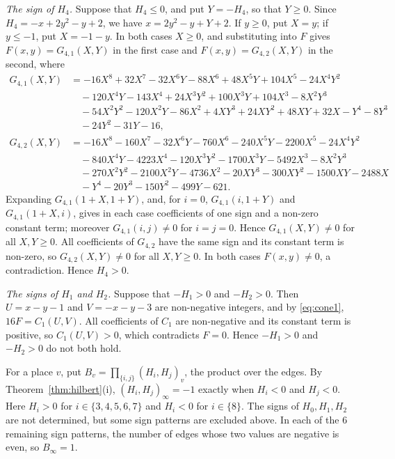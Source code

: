 \documentclass[11pt]{article}
\begin{document}
\emph{The sign of $H_{4}$.} Suppose that $H_{4}\leq0$, and put $Y=-H_{4}$, so that $Y\geq0$. Since $H_{4}=-x+2y^{2}-y+2$, we have $x=2y^{2}-y+Y+2$. If $y\geq0$, put $X=y$; if $y\leq-1$, put $X=-1-y$. In both cases $X\geq0$, and substituting into $F$ gives $F(x,y)=G_{4,1}(X,Y)$ in the first case and $F(x,y)=G_{4,2}(X,Y)$ in the second, where
\begin{align*}
G_{4,1}(X,Y)&=-16X^{8}+32X^{7}-32X^{6}Y-88X^{6}+48X^{5}Y+104X^{5}-24X^{4}Y^{2}\\
&\quad-120X^{4}Y-143X^{4}+24X^{3}Y^{2}+100X^{3}Y+104X^{3}-8X^{2}Y^{3}\\
&\quad-54X^{2}Y^{2}-120X^{2}Y-86X^{2}+4XY^{3}+24XY^{2}+48XY+32X-Y^{4}-8Y^{3}\\
&\quad-24Y^{2}-31Y-16,\\
G_{4,2}(X,Y)&=-16X^{8}-160X^{7}-32X^{6}Y-760X^{6}-240X^{5}Y-2200X^{5}-24X^{4}Y^{2}\\
&\quad-840X^{4}Y-4223X^{4}-120X^{3}Y^{2}-1700X^{3}Y-5492X^{3}-8X^{2}Y^{3}\\
&\quad-270X^{2}Y^{2}-2100X^{2}Y-4736X^{2}-20XY^{3}-300XY^{2}-1500XY-2488X\\
&\quad-Y^{4}-20Y^{3}-150Y^{2}-499Y-621.
\end{align*}
Expanding $G_{4,1}(1+X,1+Y)$, and, for $i=0$, $G_{4,1}(i,1+Y)$ and $G_{4,1}(1+X,i)$, gives in each case coefficients of one sign and a non-zero constant term; moreover $G_{4,1}(i,j)\neq0$ for $i=j=0$. Hence $G_{4,1}(X,Y)\neq0$ for all $X,Y\geq0$. All coefficients of $G_{4,2}$ have the same sign and its constant term is non-zero, so $G_{4,2}(X,Y)\neq0$ for all $X,Y\geq0$. In both cases $F(x,y)\neq0$, a contradiction. Hence $H_{4}>0$.

\emph{The signs of $H_{1}$ and $H_{2}$.} Suppose that $-H_{1}>0$ and $-H_{2}>0$. Then $U=x-y-1$ and $V=-x-y-3$ are non-negative integers, and by \eqref{eq:cone1}, $16F=C_{1}(U,V)$. All coefficients of $C_{1}$ are non-negative and its constant term is positive, so $C_{1}(U,V)>0$, which contradicts $F=0$. Hence $-H_{1}>0$ and $-H_{2}>0$ do not both hold.

For a place $v$, put $B_v=\prod_{\{i,j\}}(H_i,H_j)_v$, the product over the edges. By Theorem~\ref{thm:hilbert}(i), $(H_i,H_j)_\infty=-1$ exactly when $H_i<0$ and $H_j<0$. Here $H_i>0$ for $i\in\{3,\allowbreak 4,\allowbreak 5,\allowbreak 6,\allowbreak 7\}$ and $H_i<0$ for $i\in\{8\}$. The signs of $H_{0}, H_{1}, H_{2}$ are not determined, but some sign patterns are excluded above. In each of the 6 remaining sign patterns, the number of edges whose two values are negative is even, so $B_\infty=1$.
\end{document}
